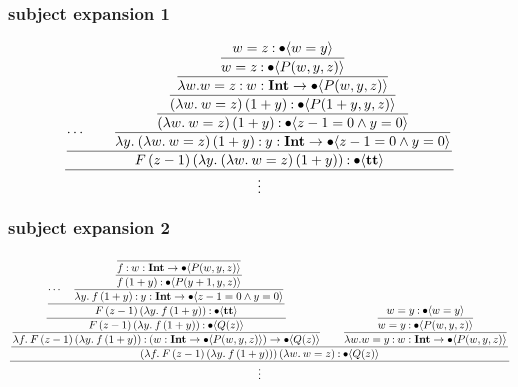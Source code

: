 \documentclass{article}
\begin{document}
\subsubsection{subject expansion 1}

\begin{equation*}
    \dfrac{
    \dfrac{
        \cdots
        \qquad
        \dfrac{
            \dfrac{
                \dfrac{
                    \dfrac{
                        \dfrac{
                            w = z \mathbin{:} \bullet \langle  w = y \rangle
                        }{
                            w = z \mathbin{:} \bullet \langle P(w, y, z) \rangle
                        }
                    }{
                        \lambda w. w = z \mathbin{:} {w} : \textbf{Int} \to \bullet \langle P(w, y, z) \rangle
                    }
                }{
                    (\lambda w.\: w = z)\,(1+y) \mathbin{:} \bullet \langle P(1+y, y, z) \rangle
                }
            }{
                (\lambda w.\: w = z)\,(1+y) \mathbin{:} \bullet \langle z-1 = 0 \wedge y = 0 \rangle
            }
        }{
            \lambda y.\: (\lambda w.\: w = z)\,(1+y) \mathbin{:} {y} : \textbf{Int} \to \bullet \langle z-1 = 0 \wedge y = 0 \rangle
        }
    }{
        F\, (z-1) \,(\lambda y.\: (\lambda w.\: w = z)\,(1+y)) \mathbin{:} \bullet \langle \textbf{tt} \rangle
    }
    }{\vdots}
\end{equation*}

\subsubsection{subject expansion 2}

\begin{equation*}
    \dfrac{
    \dfrac{
        \dfrac{
            \dfrac{
                \dfrac{
                    \cdots
                    \quad
                    \dfrac{
                        \dfrac{
                            \dfrac{}{
                                f \mathbin{:} {w} : \textbf{Int} \to \bullet \langle P(w, y, z) \rangle
                            }
                        }{
                            f\,(1+y) \mathbin{:} \bullet \langle P(y+1, y, z) \rangle
                        }
                    } {
                        \lambda y.\: f\,(1+y) \mathbin{:} {y} : \textbf{Int} \to \bullet \langle z - 1 = 0 \wedge y = 0 \rangle
                    }
                }{
                    F\, (z-1)\, (\lambda y.\: f\,(1+y))  \mathbin{:} \bullet \langle \textbf{tt} \rangle
                }
            }{
                F\, (z-1)\, (\lambda y.\: f\,(1+y))  \mathbin{:} \bullet \langle Q(z) \rangle
            }
        }{
            \lambda f.\: F\, (z-1)\, (\lambda y.\: f\,(1+y)) \mathbin{:} ({w} : \textbf{Int} \to \bullet \langle P(w, y, z) \rangle) \to \bullet \langle Q(z) \rangle
        }
        \qquad 
        \dfrac{
            \dfrac{
                w = y \mathbin{:} \bullet \langle  w = y \rangle
            }{
                w = y \mathbin{:} \bullet \langle P(w, y, z) \rangle
            }
        }{
            \lambda w. w = y \mathbin{:} {w} : \textbf{Int} \to \bullet \langle P(w, y, z) \rangle
        }
    }{
        (\lambda f.\: F\, (z-1)\, (\lambda y.\: f\,(1+y)))\, (\lambda w.\: w = z) \mathbin{:} \bullet \langle Q(z) \rangle
    }}{
    \vdots
    }
\end{equation*}
\end{document}
